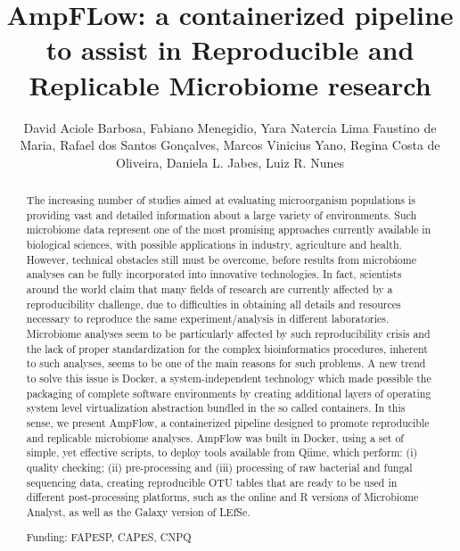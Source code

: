 \documentclass[twoside]{article}
\title{\vspace{-15mm}\fontsize{24pt}{10pt}\selectfont\textbf{ AmpFLow: a containerized pipeline to assist in Reproducible and Replicable Microbiome research }} %
\author{ David Aciole Barbosa, Fabiano Menegidio, Yara Natercia Lima Faustino de Maria, Rafael dos Santos Gon\c{c}alves, Marcos Vinicius Yano, Regina Costa de Oliveira, Daniela L. Jabes, Luiz R. Nunes }
\affil{ UMC }
\date{}
\begin{document}
  
  
  \maketitle %
  
  
  \thispagestyle{fancy} %
  
  
  \begin{abstract}
  The increasing number of studies aimed at evaluating microorganism populations is providing vast and detailed information about a large variety of environments. Such microbiome data represent one of the most promising approaches currently available in biological sciences,  with possible applications in industry,  agriculture and health. However,  technical obstacles still must be overcome,  before results from microbiome analyses can be fully incorporated into innovative technologies. In fact,  scientists around the world claim that many fields of research are currently affected by a reproducibility challenge,  due to difficulties in obtaining all details and resources necessary to reproduce the same experiment/analysis in different laboratories. Microbiome analyses seem to be particularly affected by such reproducibility crisis and the lack of proper standardization for the complex bioinformatics procedures,  inherent to such analyses,  seems to be one of the main reasons for such problems. A new trend to solve this issue is Docker,  a system-independent technology which made possible the packaging of complete software environments by creating additional layers of operating system level virtualization abstraction bundled in the so called containers. In this sense,  we present AmpFlow,  a containerized pipeline designed to promote reproducible and replicable microbiome analyses. AmpFlow was built in Docker,  using a set of simple,  yet effective scripts,  to deploy tools available from Qiime,  which perform: (i) quality checking; (ii) pre-processing and (iii) processing of raw bacterial and fungal sequencing data,  creating reproducible OTU tables that are ready to be used in different post-processing platforms,  such as the online and R versions of Microbiome Analyst,  as well as the Galaxy version of LEfSe.
  
  Funding: FAPESP,  CAPES,  CNPQ \\ 
  \end{abstract}
  
\end{document}
